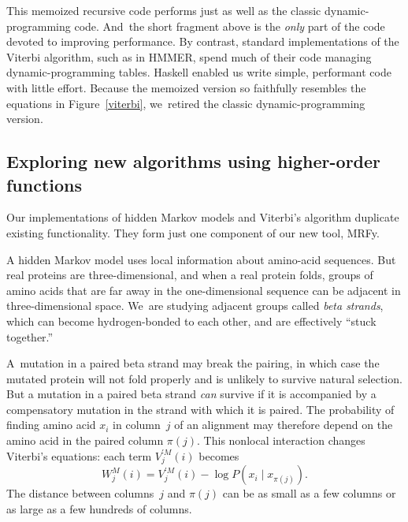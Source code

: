 \documentclass[preprint,nonatbib,blockstyle,nocopyrightspace,times]{sigplanconf}
\newcommand\pairedwith[1]{{\pi(#1)}}
\newcommand\figref[1]{Figure~\ref{#1}}
\newcommand\seclabel[1]{\label{sec:#1}}
\begin{document}
This memoized recursive code performs just as well as the classic
dynamic-programming code.
And~the short fragment above is the \emph{only} part of the code
devoted to improving performance.
By contrast, standard implementations of the Viterbi algorithm, such as in HMMER,
spend much of their code 
managing dynamic-programming tables.
Haskell enabled us write simple, performant code with little effort.
%
Because the memoized version so faithfully resembles the equations in
\figref{viterbi}, we~retired the classic dynamic-programming version.





\subsection{Exploring new algorithms using higher-order functions}

\seclabel{hofs}
\seclabel{mrfy}


Our implementations of hidden Markov models and Viterbi's algorithm
duplicate existing functionality.
They form just one component of our new tool, MRFy.

A hidden Markov model uses local information about
amino-acid sequences.
But real proteins are three-dimensional,
and when a real protein folds, groups of amino acids
that are far away in the one-dimensional sequence can be
adjacent in three-dimensional space.
We~are studying adjacent groups called \emph{beta strands}, which
can become hydrogen-bonded to each other,
and are effectively ``stuck together.''

A~mutation in a paired beta strand may break the pairing, in which
 case the mutated protein will not fold properly and is unlikely to
 survive natural selection.
But a mutation in a paired beta strand \emph{can} survive if it is
 accompanied by a compensatory mutation in the strand with which it is
 paired. 
The probability of finding amino acid $x_i$ in column~$j$ of an alignment may
 therefore depend on the amino acid in the paired column
 $\pairedwith j$.
This nonlocal interaction changes
Viterbi's equations:
each term $V_{j}^{\prime M}(i)$ becomes
$$W_{j}^{M}(i) = V_{j}^{\prime M}(i) - \log P(x_{i} \mid x_{\pairedwith j}).$$
The distance between columns~$j$ and $\pairedwith j$ can be as small
 as a few columns or as large as a few hundreds of columns.
\end{document}
